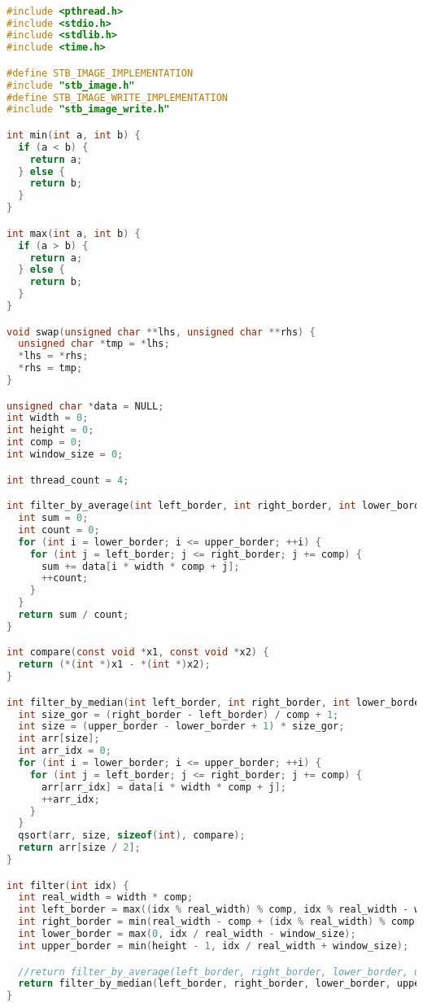 \begin{lstlisting}[language=C]

#include <pthread.h>
#include <stdio.h>
#include <stdlib.h>
#include <time.h>

#define STB_IMAGE_IMPLEMENTATION
#include "stb_image.h"
#define STB_IMAGE_WRITE_IMPLEMENTATION
#include "stb_image_write.h"

int min(int a, int b) {
  if (a < b) {
    return a;
  } else {
    return b;
  }
}

int max(int a, int b) {
  if (a > b) {
    return a;
  } else {
    return b;
  }
}

void swap(unsigned char **lhs, unsigned char **rhs) {
  unsigned char *tmp = *lhs;
  *lhs = *rhs;
  *rhs = tmp;
}

unsigned char *data = NULL;
int width = 0;
int height = 0;
int comp = 0;
int window_size = 0;

int thread_count = 4;

int filter_by_average(int left_border, int right_border, int lower_border, int upper_border) {
  int sum = 0;
  int count = 0;
  for (int i = lower_border; i <= upper_border; ++i) {
    for (int j = left_border; j <= right_border; j += comp) {
      sum += data[i * width * comp + j];
      ++count;
    }
  }
  return sum / count;
}

int compare(const void *x1, const void *x2) {
  return (*(int *)x1 - *(int *)x2);
}

int filter_by_median(int left_border, int right_border, int lower_border, int upper_border) {
  int size_gor = (right_border - left_border) / comp + 1;
  int size = (upper_border - lower_border + 1) * size_gor;
  int arr[size];
  int arr_idx = 0;
  for (int i = lower_border; i <= upper_border; ++i) {
    for (int j = left_border; j <= right_border; j += comp) {
      arr[arr_idx] = data[i * width * comp + j];
      ++arr_idx;
    }
  }
  qsort(arr, size, sizeof(int), compare);
  return arr[size / 2];
}

int filter(int idx) {
  int real_width = width * comp;
  int left_border = max((idx % real_width) % comp, idx % real_width - window_size * comp);
  int right_border = min(real_width - comp + (idx % real_width) % comp, idx % real_width + window_size * comp);
  int lower_border = max(0, idx / real_width - window_size);
  int upper_border = min(height - 1, idx / real_width + window_size);

  //return filter_by_average(left_border, right_border, lower_border, upper_border);
  return filter_by_median(left_border, right_border, lower_border, upper_border);
}


\end{lstlisting}
